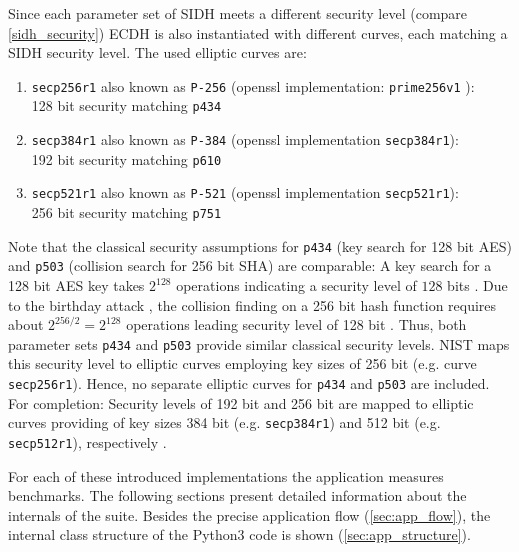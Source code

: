 Since each parameter set of \gls{SIDH} meets a different security level (compare \autoref{sidh_security}) \gls{ECDH} is also instantiated with different curves, each matching a \gls{SIDH} security level. The used elliptic curves are:
\begin{enumerate}
\item \texttt{secp256r1} also known as \texttt{P-256} (\gls{openssl} implementation: \texttt{prime256v1} \parencite{turner2009elliptic}): \\128 bit security matching \texttt{p434} \parencite{brown2010sec}
\item \texttt{secp384r1} also known as \texttt{P-384} (\gls{openssl} implementation \texttt{secp384r1}): \\192 bit security matching \texttt{p610} \parencite{brown2010sec}
\item \texttt{secp521r1} also known as \texttt{P-521} (\gls{openssl} implementation \texttt{secp521r1}): \\256 bit security  matching \texttt{p751} \parencite{brown2010sec}
\end{enumerate}

Note that the classical security assumptions for \texttt{p434} (key search for 128 bit AES) and \texttt{p503} (collision search for 256 bit SHA) are comparable: A key search for a 128 bit AES key takes $2^{128}$ operations indicating a security level of $128$ bits \parencite{lenstra2006key}. Due to the birthday attack \parencite{gupta2015birthday}, the collision finding on a 256 bit hash function requires about $2^{256/2} = 2^{128}$ operations leading security level of 128 bit \parencite{lenstra2006key}. Thus, both parameter sets \texttt{p434} and \texttt{p503} provide similar classical security levels. NIST maps this security level to elliptic curves employing key sizes of 256 bit (e.g. curve \texttt{secp256r1}). Hence, no separate elliptic curves for \texttt{p434} and \texttt{p503} are included. For completion: Security levels of 192 bit and 256 bit are mapped to elliptic curves providing of key sizes 384 bit (e.g.  \texttt{secp384r1}) and 512 bit (e.g.  \texttt{secp512r1}), respectively \parencite{barker2016recommendation}. 


For each of these introduced implementations the application measures benchmarks. The following sections present detailed information about the internals of the suite. Besides the precise application flow (\autoref{sec:app_flow}), the internal class structure of the Python3 code is shown (\autoref{sec:app_structure}).


